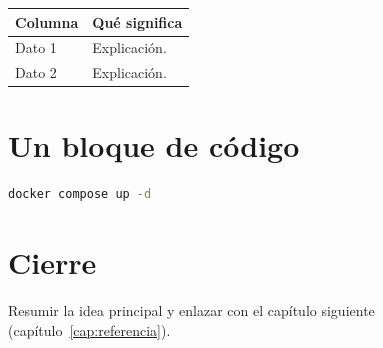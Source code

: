 \begin{center}
\begin{tabular}{@{}ll@{}}
  \toprule
  \textbf{Columna} & \textbf{Qué significa} \\
  \midrule
  Dato 1 & Explicación. \\
  Dato 2 & Explicación. \\
  \bottomrule
\end{tabular}
\end{center}

\section{Un bloque de código}

\begin{lstlisting}[language=bash, caption={Qué hace este comando},
                   label={lst:mi-comando}]
docker compose up -d
\end{lstlisting}

\section{Cierre}

Resumir la idea principal y enlazar con el capítulo siguiente
(capítulo~\ref{cap:referencia}).
